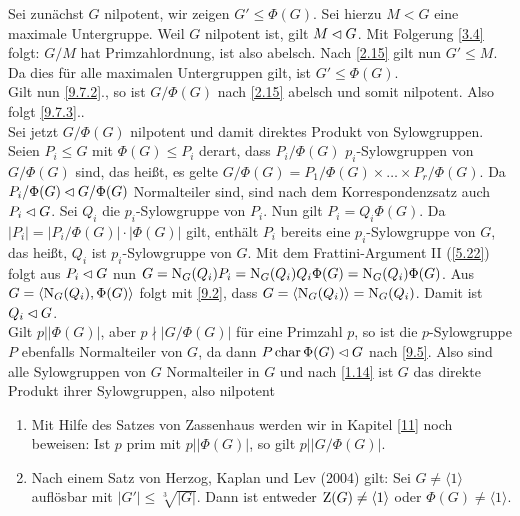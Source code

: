 \begin{beweis}
 Sei zun\"achst $G$ nilpotent, wir zeigen $G'\leq\Phi(G)$. Sei hierzu $M < G$ eine maximale Untergruppe. Weil $G$ nilpotent ist, gilt $M\lhd G$. Mit Folgerung \ref{3.4} folgt: $G/M$ hat Primzahlordnung, ist also abelsch. Nach \ref{2.15} gilt nun $G'\leq M$. Da dies f\"ur alle maximalen Untergruppen gilt, ist $G'\leq \Phi(G)$.\\
 Gilt nun \ref{9.7.2}., so ist $G/\Phi(G)$ nach \ref{2.15} abelsch und somit nilpotent. Also folgt \ref{9.7.3}..\\
 Sei jetzt $G/\Phi(G)$ nilpotent und damit direktes Produkt von Sylowgruppen. Seien $P_i\leq G$ mit $\Phi(G)\leq P_i$ derart, dass $P_i/\Phi(G)$ $p_i$-Sylowgruppen von $G/\Phi(G)$ sind, das hei\ss{}t, es gelte $G/\Phi(G)=P_1/\Phi(G)\times\ldots\times P_r/\Phi(G)$.
Da $P_i/\Phi(G)\lhd G/\Phi(G)$ Normalteiler sind, sind nach dem Korrespondenzsatz auch $P_i\lhd G$. Sei $Q_i$ die $p_i$-Sylowgruppe von $P_i$. Nun gilt $P_i=Q_i\Phi(G)$. Da $|P_i|=|P_i/\Phi(G)|\cdot|\Phi(G)|$ gilt, enth\"alt $P_i$ bereits eine $p_i$-Sylowgruppe von $G$, das hei\ss{}t, $Q_i$ ist $p_i$-Sylowgruppe von $G$. Mit dem Frattini-Argument II (\ref{5.22}) folgt aus $P_i\lhd G$ nun $G=\operatorname{N}_G(Q_i)P_i=\operatorname{N}_G(Q_i)Q_i\Phi(G)=\operatorname{N}_G(Q_i)\Phi(G)$.
Aus $G=\langle\operatorname{N}_G(Q_i), \Phi(G)\rangle$ folgt mit \ref{9.2}, dass $G=\langle\operatorname{N}_G(Q_i)\rangle=\operatorname{N}_G(Q_i)$. Damit ist $Q_i \lhd G$.\\
Gilt $p||\Phi(G)|$, aber $p\nmid |G/\Phi(G)|$ f\"ur eine Primzahl $p$, so ist die $p$-Sylowgruppe $P$ ebenfalls Normalteiler von $G$, da dann $P\operatorname{char} \Phi(G)\lhd G$ nach \ref{9.5}.
Also sind alle Sylowgruppen von $G$ Normalteiler in $G$ und nach \ref{1.14} ist $G$ das direkte Produkt ihrer Sylowgruppen, also nilpotent

\end{beweis}


\begin{bemerkung}\spspace
{}
\begin{enumerate}
 \item Mit Hilfe des Satzes von Zassenhaus werden wir in Kapitel \ref{11} noch beweisen: Ist $p$ prim mit $p| |\Phi(G)|$, so gilt $p||G/\Phi(G)|$.
\item Nach einem Satz von Herzog, Kaplan und Lev (2004) gilt: Sei $G\neq \langle 1\rangle$ aufl\"osbar mit $|G'|\leq \sqrt[3]{|G|}$. Dann ist entweder $\operatorname{Z}(G)\neq \langle 1\rangle$ oder $\Phi(G)\neq \langle 1 \rangle$.
\end{enumerate}

\end{bemerkung}

